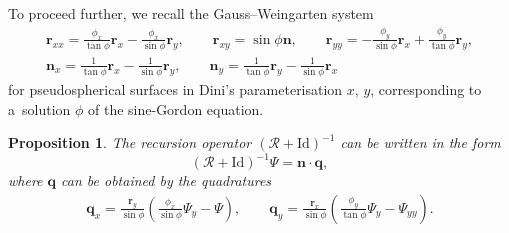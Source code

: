 \documentclass[pdftex]{sigma}
\let\ve\mathbf
\def\RO{{\mathcal R}}
\numberwithin{equation}{section}
\newtheorem{Proposition}[Theorem]{Proposition}
\theoremstyle{definition}
\begin{document}
To proceed further, we recall the Gauss--Weingarten system
\begin{gather*}%
\ve r_{xx}
 = \frac{\phi_x}{\tan \phi} \ve r_x - \frac{\phi_x}{\sin \phi} \ve r_y,
\qquad
\ve r_{xy} = \sin \phi \ve n,
\qquad
\ve r_{yy}
 = -\frac{\phi_y}{\sin \phi} \ve r_x + \frac{\phi_y}{\tan \phi} \ve r_y,
\\
\ve n_x = \frac{1}{\tan \phi} \ve r_x - \frac{1}{\sin \phi} \ve r_y,
\qquad
\ve n_y = \frac{1}{\tan \phi} \ve r_y - \frac{1}{\sin \phi} \ve r_x
\end{gather*}
for pseudospherical surfaces in Dini's parameterisation $x$, $y$,
corresponding to a~solution $\phi$ of the sine-Gordon equation.



\begin{Proposition} \label{prop:sG:iro}
The recursion operator $(\RO + \mathrm{Id})^{-1}$ can be written in the form
\[
(\RO + \mathrm{Id})^{-1}\Psi = \ve n \cdot \ve q,
\]
where $\ve q$ can be obtained by the quadratures
\begin{gather}
\ve q_{x}
 = \frac{\ve r_y}{\sin\phi}\left(
 \frac{\phi_x}{\sin\phi}\Psi_y - \Psi\right),
\qquad
\ve q_{y}
 = \frac{\ve r_x}{\sin\phi}\left(
 \frac{\phi_y}{\tan\phi} \Psi_y - \Psi_{yy}\right).
\label{eq:sG:iro:q}
\end{gather}
\end{Proposition}
\end{document}

